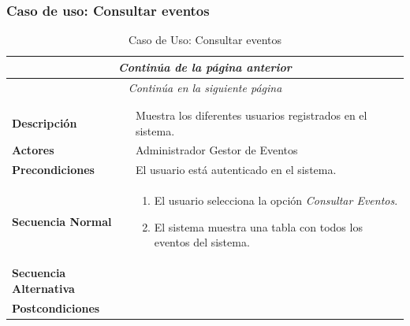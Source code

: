 \newpage
\subsubsection*{Caso de uso: Consultar eventos }
\begin{longtable}{| p{4cm} | p{10cm} |}
\endfirsthead
\multicolumn{2}{c}{\textit{Continúa de la página anterior}}\\[12pt]
\hline
\endhead
\hline
\multicolumn{2}{c}{\textit{Continúa en la siguiente página}} \\
\endfoot
\hline
\caption{Caso de Uso: Consultar eventos}\label{fig:1}\\
\endlastfoot


\hline
\multicolumn{2}{|c|}{\textbf{CU$<$37$>$ - Consultar Eventos}} \\

\hline
\textbf{Descripción} &
Muestra los diferentes usuarios registrados en el sistema.\\

\hline
\textbf{Actores} &
Administrador\newline
Gestor de Eventos\\

\hline
\textbf{Precondiciones} &
El usuario está autenticado en el sistema.\\

\hline
\textbf{Secuencia Normal} &\mbox{}\par\vspace{-\baselineskip}
\begin{enumerate}[leftmargin=0.7cm, topsep=0.1cm]
\item El usuario selecciona la opción \textit{Consultar Eventos}.
\item El sistema muestra una tabla con todos los eventos del sistema.
\end{enumerate}


\\
\hline
\textbf{Secuencia Alternativa} &\mbox{}\par\vspace{-\baselineskip}
\\

\hline
\textbf{Postcondiciones} & \\
\hline
\end{longtable}



\newpage
